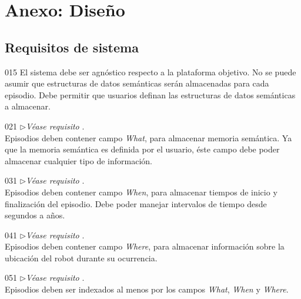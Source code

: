 \chapter{Anexo: Diseño}\label{chapter:appendix_a}

\section{Requisitos de sistema}\label{appendix:req-sistema}

\newenvironment{requisito-sistema}[2]
{
	\noindent{\bfseries Requisito \RSlabel{#1}}
	\hfill\textit{(Derivado de }\RPlabel{#2})\\
}{}
\newcommand{\RSlinkStachowicz}[1]{$\triangleright$\textit{Véase requisito }\RStachowicz{#1}.\\}

\begin{requisito-sistema}{01}{5}
	El sistema debe ser agnóstico respecto a la plataforma objetivo. No se puede asumir que estructuras de datos semánticas serán almacenadas para cada episodio. Debe permitir que usuarios definan las estructuras de datos semánticas a almacenar.
\end{requisito-sistema}

\begin{requisito-sistema}{02}{1}
	\RSlinkStachowicz{1}
	Episodios deben contener campo \textit{What}, para almacenar memoria semántica. Ya que la memoria semántica es definida por el usuario, éste campo debe poder almacenar cualquier tipo de información.	
\end{requisito-sistema}

\begin{requisito-sistema}{03}{1}
	\RSlinkStachowicz{1}
	Episodios deben contener campo \textit{When}, para almacenar tiempos de inicio y finalización del episodio. Debe poder manejar intervalos de tiempo desde segundos a años.	
\end{requisito-sistema}

\begin{requisito-sistema}{04}{1}
	\RSlinkStachowicz{1}
	Episodios deben contener campo \textit{Where}, para almacenar información sobre la ubicación del robot durante su ocurrencia.	
\end{requisito-sistema}

\begin{requisito-sistema}{05}{1}
	\RSlinkStachowicz{2}
	Episodios deben ser indexados al menos por los campos \textit{What}, \textit{When} y \textit{Where}.
\end{requisito-sistema}

